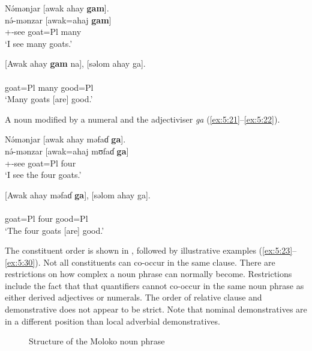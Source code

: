 \ea \label{ex:5:19}
N\'{ə}mənjar  [awak  ahay  \textbf{gam}].\\
\gll  n\'{ə}-mənzar  [awak=ahaj  \textbf{gam}]\\
      {\oneS}+{\IFV}-see  goat=Pl  many\\
\glt  ‘I see many goats.’
\z

\ea \label{ex:5:20}
{}[Awak  ahay  \textbf{gam}  na],  [səlom  ahay  ga].\\
\gll  [awak=ahaj   \textbf{gam}   na]   [sʊlɔm=ahaj   ga]\\
      goat=Pl  many  {\PSP}  good=Pl  {\ADJ}\\
\glt  ‘Many goats [are] good.’
\z

A noun modified by a numeral and the adjectiviser \textit{ga} (\ref{ex:5:21}--\ref{ex:5:22}).

\ea \label{ex:5:21}
N\'{ə}mənjar  [awak  ahay  məfaɗ \textbf{ga}].\\
\gll  n\'{ə}-mənzar  [awak=ahaj  mʊfaɗ   \textbf{ga}]\\
      {\oneS}+{\IFV}-see  goat=Pl  four  {\ADJ}\\
\glt  ‘I see the four goats.’
\z

\ea \label{ex:5:22}
{}[Awak  ahay  məfaɗ \textbf{ga}],  [səlom  ahay  ga].\\
\gll  [awak=ahaj   mʊfaɗ   \textbf{ga}]   [sʊlɔm=ahaj   ga]\\
      goat=Pl  four  {\ADJ}  good=Pl  {\ADJ}\\
\glt  ‘The four goats [are] good.’
\z

The constituent order is shown in , followed by illustrative examples (\ref{ex:5:23}--\ref{ex:5:30}). Not all constituents can co-occur in the same clause. There are restrictions on how complex a noun phrase can normally become. Restrictions include the fact that that quantifiers cannot co-occur in the same noun phrase as either derived adjectives or numerals. The order of relative clause and demonstrative does not appear to be strict. Note that nominal demonstratives are in a different position than local adverbial demonstratives.

\begin{figure}
\caption{Structure of the Moloko noun phrase}\label{fig:8}
\end{figure}

